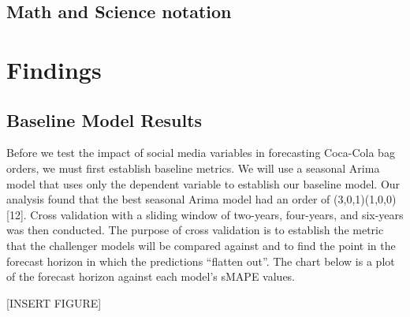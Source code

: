 \documentclass[12pt,oneside]{chicagocapstone}
\begin{document}
\newpage

\section*{Math and Science notation}\label{math-sci}

\chapter*{Findings}\label{findings}

\section*{Baseline Model Results}\label{baseline-model-results}

Before we test the impact of social media variables in forecasting
Coca-Cola bag orders, we must first establish baseline metrics. We will
use a seasonal Arima model that uses only the dependent variable to
establish our baseline model. Our analysis found that the best seasonal
Arima model had an order of (3,0,1)(1,0,0){[}12{]}. Cross validation
with a sliding window of two-years, four-years, and six-years was then
conducted. The purpose of cross validation is to establish the metric
that the challenger models will be compared against and to find the
point in the forecast horizon in which the predictions ``flatten out''.
The chart below is a plot of the forecast horizon against each model's
sMAPE values.

{[}INSERT FIGURE{]}
\end{document}
